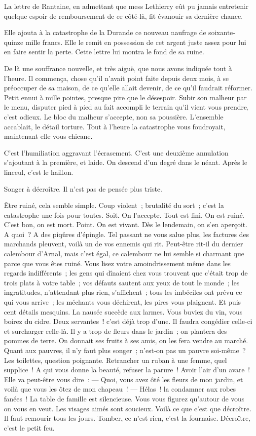 \documentclass[french,twoside]{book} %
\begin{document}
La lettre de Rantaine, en admettant que mess Lethierry eût pu jamais entretenir quelque espoir de remboursement de ce côté-là, fit évanouir sa dernière chance.\par
Elle ajouta à la catastrophe de la Durande ce nouveau naufrage de soixante-quinze mille francs. Elle le remit en possession de cet argent juste assez pour lui en faire sentir la perte. Cette lettre lui montra le fond de sa ruine.\par
De là une souffrance nouvelle, et très aiguë, que nous avons indiquée tout à l’heure. Il commença, chose qu’il n’avait point faite depuis deux mois, à se préoccuper de sa maison, de ce qu’elle allait devenir, de ce qu’il faudrait réformer. Petit ennui à mille pointes, presque pire que le désespoir. Subir son malheur par le menu, disputer pied à pied au fait accompli le terrain qu’il vient vous prendre, c’est odieux. Le bloc du malheur s’accepte, non sa poussière. L’ensemble accablait, le détail torture. Tout à l’heure la catastrophe vous foudroyait, maintenant elle vous chicane.\par
C’est l’humiliation aggravant l’écrasement. C’est une deuxième annulation s’ajoutant à la première, et laide. On descend d’un degré dans le néant. Après le linceul, c’est le haillon.\par
Songer à décroître. Il n’est pas de pensée plus triste.\par
 Être ruiné, cela semble simple. Coup violent ; brutalité du sort ; c’est la catastrophe une fois pour toutes. Soit. On l’accepte. Tout est fini. On est ruiné. C’est bon, on est mort. Point. On est vivant. Dès le lendemain, on s’en aperçoit. A quoi ? A des piqûres d’épingle. Tel passant ne vous salue plus, les factures des marchands pleuvent, voilà un de vos ennemis qui rit. Peut-être rit-il du dernier calembour d’Arnal, mais c’est égal, ce calembour ne lui semble si charmant que parce que vous êtes ruiné. Vous lisez votre amoindrissement même dans les regards indifférents ; les gens qui dînaient chez vous trouvent que c’était trop de trois plats à votre table ; vos défauts sautent aux yeux de tout le monde ; les ingratitudes, n’attendant plus rien, s’affichent ; tous les imbéciles ont prévu ce qui vous arrive ; les méchants vous déchirent, les pires vous plaignent. Et puis cent détails mesquins. La nausée succède aux larmes. Vous buviez du vin, vous boirez du cidre. Deux servantes ! c’est déjà trop d’une. Il faudra congédier celle-ci et surcharger celle-là. Il y a trop de fleurs dans le jardin ; on plantera des pommes de terre. On donnait ses fruits à ses amis, on les fera vendre au marché. Quant aux pauvres, il n’y faut plus songer ; n’est-on pas un pauvre soi-même ? Les toilettes, question poignante. Retrancher un ruban à une femme, quel supplice ! A qui vous donne la beauté, refuser la parure ! Avoir l’air d’un avare ! Elle va peut-être vous dire : — Quoi, vous avez ôté les fleurs de mon jardin, et voilà que vous les ôtez de mon chapeau ! — Hélas ! la condamner aux robes fanées ! La table  de famille est silencieuse. Vous vous figurez qu’autour de vous on vous en veut. Les visages aimés sont soucieux. Voilà ce que c’est que décroître. Il faut remourir tous les jours. Tomber, ce n’est rien, c’est la fournaise. Décroître, c’est le petit feu.\par
\end{document}
